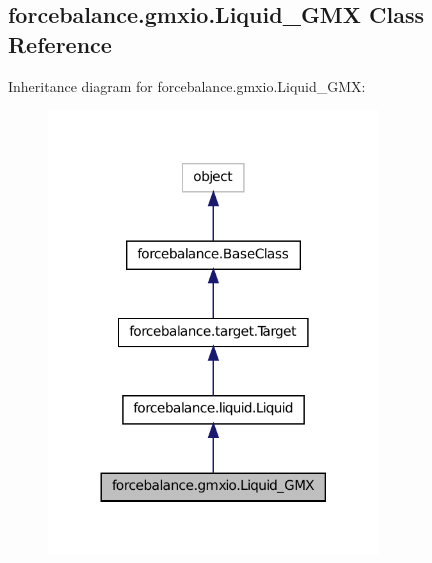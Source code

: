 \hypertarget{classforcebalance_1_1gmxio_1_1Liquid__GMX}{\subsection{forcebalance.\-gmxio.\-Liquid\-\_\-\-G\-M\-X Class Reference}
\label{classforcebalance_1_1gmxio_1_1Liquid__GMX}
}


Inheritance diagram for forcebalance.\-gmxio.\-Liquid\-\_\-\-G\-M\-X\-:\nopagebreak
\begin{figure}[H]
\begin{center}
\leavevmode
\includegraphics[width=248pt]{classforcebalance_1_1gmxio_1_1Liquid__GMX__inherit__graph}
\end{center}
\end{figure}


